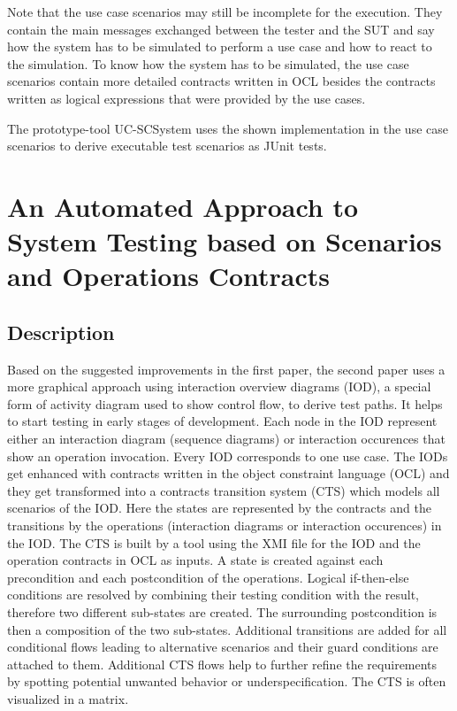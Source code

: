 Note that the use case scenarios may still be incomplete for the execution. They contain the main messages exchanged between the tester and the SUT and say how the system has to be simulated to perform a use case and how to react to the simulation. To know how the system has to be simulated, the use case scenarios contain more detailed contracts written in OCL besides the contracts written as logical expressions that were provided by the use cases. 

The prototype-tool UC-SCSystem uses the shown implementation in the use case scenarios to derive executable test scenarios as JUnit tests.

\section{An Automated Approach to System Testing based on Scenarios and Operations Contracts} \label{approachtwo}

\subsection{Description}

Based on the suggested improvements in the first paper, the second paper uses a more graphical approach using interaction overview diagrams (IOD), a special form of activity diagram used to show control flow, to derive test paths. It helps to start testing in early stages of development. Each node in the IOD represent either an interaction diagram (sequence diagrams) or interaction occurences that show an operation invocation. Every IOD corresponds to one use case. The IODs get enhanced with contracts written in the object constraint language (OCL) and they get transformed into a contracts transition system (CTS) which models all scenarios of the IOD. Here the states are represented by the contracts and the transitions by the operations (interaction diagrams or interaction occurences) in the IOD. The CTS is built by a tool using the XMI file for the IOD and the operation contracts in OCL as inputs. A state is created against each precondition and each postcondition of the operations. Logical if-then-else conditions are resolved by combining their testing condition with the result, therefore two different sub-states are created. The surrounding postcondition is then a composition of the two sub-states. Additional transitions are added for all conditional flows leading to alternative scenarios and their guard conditions are attached to them. Additional CTS flows help to further refine the requirements by spotting potential unwanted behavior or underspecification. The CTS is often visualized in a matrix. 

